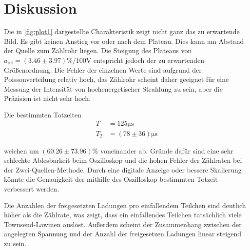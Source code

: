 \section{Diskussion}
\label{sec:Diskussion}

Die in \autoref{fig:plot1} dargestellte Charakteristik zeigt nicht ganz das zu erwartende Bild.
Es gibt keinen Anstieg vor oder nach dem Plateau.
Dies kann am Abstand der Quelle zum Zählrohr liegen.
Die Steigung des Plateaus von $a_\text{rel}=(3.46 \pm 3.97)\si{\percent\per100\volt}$ entspricht jedoch der zu erwartenden Größenordnung.
Die Fehler der einzelnen Werte sind aufgrund der Poissonverteilung relativ hoch,
das Zählrohr scheint daher geeignet für eine Messung der Intensität von
hochenergetischer Strahlung zu sein, aber die Präzision ist nicht sehr hoch.

Die bestimmten Totzeiten
\begin{align*}
    T&= 125 \si{\micro\second}\\
    T_2 &= (78 \pm 36)\si{\micro\second}
\end{align*}

weichen um $(60.26 \pm 73.96) \si{\percent}$ voneinander ab.
Gründe dafür sind eine sehr schlechte Ablesbarkeit beim Oszilloskop und die hohen Fehler der Zählraten bei der Zwei-Quellen-Methode.
Durch eine digitale Anzeige oder bessere Skalierung könnte die Genauigkeit der mithilfe des Oszilloskop bestimmten Totzeit verbessert werden.


Die Anzahlen der freigesetzten Ladungen pro einfallendem
Teilchen sind deutlich höher als die Zählrate, was zeigt, dass ein einfallendes Teilchen tatsächlich viele Townsend-Lawinen
auslöst. Außerdem scheint der Zusammenhang zwischen der angelegten Spannung und der Anzahl der freigesetzen
Ladungen linear steigend zu sein.